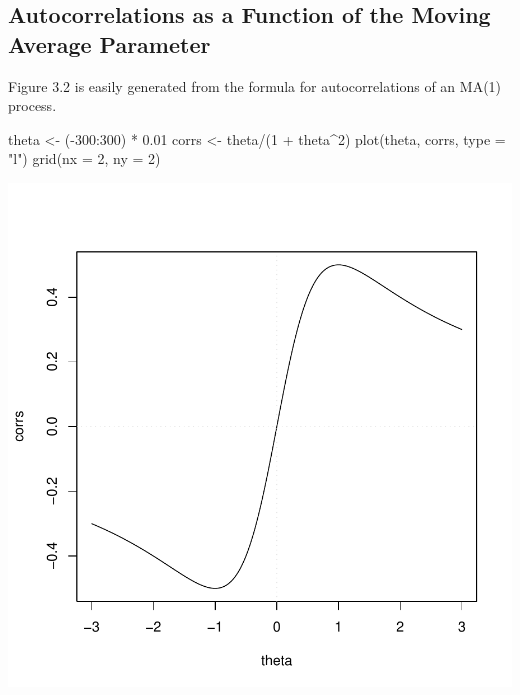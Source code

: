 \documentclass[a4paper]{article}
\renewcommand{\~}{\perispomeni}%
\begin{document}
\subsection{Autocorrelations as a Function of the Moving Average Parameter}
Figure 3.2 is easily generated from the formula for autocorrelations of an MA(1) process.
\begin{Schunk}
\begin{Sinput}
 theta <- (-300:300) * 0.01
 corrs <- theta/(1 + theta^2)
 plot(theta, corrs, type = "l")
 grid(nx = 2, ny = 2)
\end{Sinput}
\end{Schunk}
\includegraphics{Companion-019}
\end{document}
